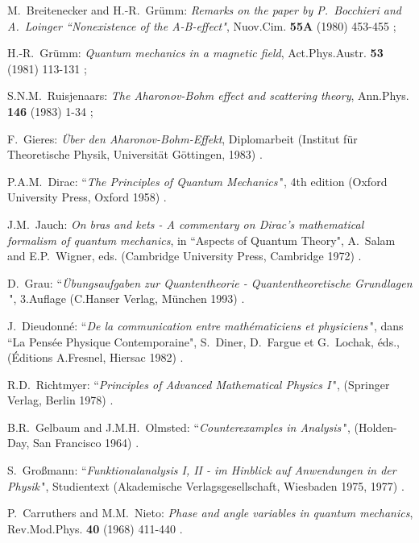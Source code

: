 \documentclass[12pt]{report}
\begin{document}
\begin{thebibliography}{22}
\newcommand{\artref}[5]{{\sc #1}: {\it #2}, #3 {\bf #4} #5}
\newcommand{\bookref}[3]{{\sc #1}: ``{\it #2}$\,$", #3}
\newcommand{\prepref}[3]{{\sc #1}: {\it #2}, #3}
 

\artref
{M.~Breitenecker and H.-R.~Gr\"umm}{Remarks on the paper
by P.~Bocchieri and A.~Loinger ``Nonexistence of the A-B-effect"}{
Nuov.Cim.}{55A}{(1980) 453-455 ;}
 
\artref
{H.-R.~Gr\"umm}{Quantum mechanics in a magnetic field}{
Act.Phys.Austr.}{53}{(1981) 113-131 ;}
 
\artref
{S.N.M.~Ruisjenaars}{The Aharonov-Bohm
effect and scattering theory}{Ann.Phys.}{
146}{(1983) 1-34 ;}
 
\prepref
{F.~Gieres}{\"Uber den Aharonov-Bohm-Effekt}{Diplomarbeit
(Institut f\"ur Theoretische Physik, 
Universit\"at G\"ottingen, 1983) .}


\bookref
{P.A.M.~Dirac}{The Principles of Quantum Mechanics}{4th edition
(Oxford University Press, Oxford 1958) .}

 
\prepref
{J.M.~Jauch}{On bras and kets 
- A commentary on Dirac's mathematical formalism 
of quantum mechanics}{in ``Aspects of Quantum Theory",
A.~Salam and E.P.~Wigner, eds. (Cambridge University Press,
Cambridge 1972) .}

 
\bookref
{D.~Grau}{\"Ubungsaufgaben zur Quantentheorie - Quantentheoretische
Grund\-lagen}{3.Auflage (C.Hanser Verlag, M\"unchen 1993) .}


\bookref
{J.~Dieudonn\'e}{De la communication entre math\'ematiciens et 
physiciens}{dans ``La Pens\'ee Physique Contemporaine", 
S.~Diner, D.~Fargue et G.~Lochak, \'eds., (\'Editions A.Fresnel, 
Hiersac 1982) .}
 
 
\bookref
{R.D.~Richtmyer}{Principles of Advanced Mathematical Physics I}{
(Springer Verlag, Berlin 1978) .}


\bookref
{B.R.~Gelbaum and J.M.H.~Olmsted}{Counterexamples in
Analysis}{(Holden-Day, San Francisco 1964) .}


\bookref
{S.~Gro\ss mann}{Funktionalanalysis I, II - im Hinblick auf
Anwendungen in der Physik}{Studientext (Akademische
Verlagsgesellschaft, Wiesbaden 1975, 1977) .}


\artref
{P.~Carruthers and M.M.~Nieto}{Phase and angle variables in quantum
mechanics}{Rev.Mod.Phys.}{40}{(1968) 411-440 .}
 

\end{thebibliography}
\end{document}
